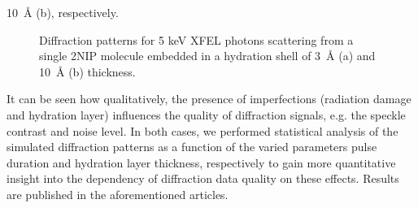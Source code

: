 \documentclass[10pt]{scrartcl}
\begin{document}
\SI{10}{\angstrom} (b), respectively.
%
\begin{figure}[ht]
  \begin{center}
  \end{center}
  \caption{Diffraction patterns for 5 keV XFEL photons scattering from a single
    2NIP molecule embedded in a hydration shell of \SI{3}{\angstrom} (a) and
    \SI{10}{\angstrom} (b) thickness.}
  \label{fig:2nip_hydration_layer}
\end{figure}

It can be seen how qualitatively, the presence of imperfections (radiation
damage and hydration layer) influences the quality of diffraction signals, e.g.
the speckle contrast and noise level.
In both cases, we performed statistical analysis of the simulated diffraction
patterns as a function of the varied parameters pulse duration and hydration
layer thickness, respectively to gain more quantitative insight into the
dependency of diffraction data quality on these effects. Results are published
in the aforementioned articles.

\printbibliography
\end{document}
